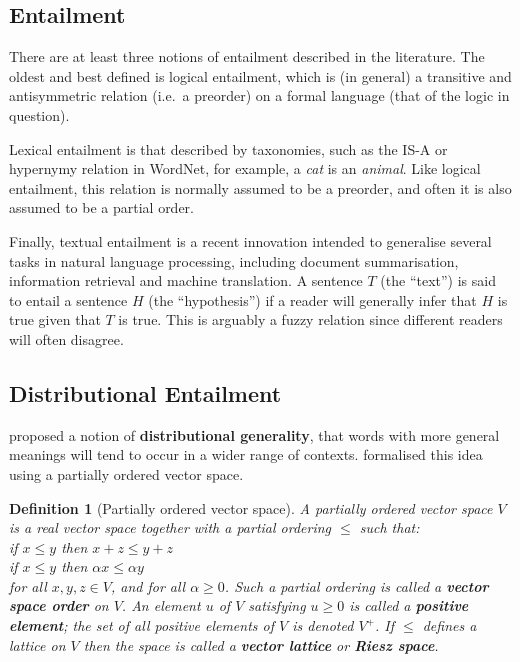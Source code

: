 \documentclass{article}
\newtheorem{definition}{Definition}
\begin{document}
\subsection{Entailment}

There are at least three notions of entailment described in the
literature. The oldest and best defined is logical entailment, which
is (in general) a transitive and antisymmetric relation (i.e.~a
preorder) on a formal language (that of the logic in question).

Lexical entailment is that described by taxonomies, such as the IS-A
or hypernymy relation in WordNet, for example, a \emph{cat} is an
\emph{animal}. Like logical entailment, this relation is normally
assumed to be a preorder, and often it is also assumed to be a partial
order.

Finally, textual entailment is a recent innovation intended to
generalise several tasks in natural language processing, including
document summarisation, information retrieval and machine
translation. A sentence $T$ (the ``text'') is said to entail a
sentence $H$ (the ``hypothesis'') if a reader will generally infer
that $H$ is true given that $T$ is true. This is arguably a fuzzy
relation since different readers will often disagree.

\subsection{Distributional Entailment}

 proposed a notion of \textbf{distributional
  generality}, that words with more general meanings will tend to
occur in a wider range of contexts.  formalised
this idea using a partially ordered vector space.

\begin{definition}[Partially ordered vector space]
  A partially ordered vector space $V$ is a real vector space together
  with a partial ordering $\le$ such that:
  \vspace{0.1cm}\\
  \indent if $x \le y$ then $x + z \le y + z$\\
  \indent if $x \le y$ then $\alpha x \le \alpha y$
  \vspace{0.1cm}\\
  for all $x,y,z \in V$, and for all $\alpha \ge 0$. Such a partial
  ordering is called a \textbf{vector space order} on $V$. An element
  $u$ of $V$ satisfying $u \ge 0$ is called a \textbf{positive
    element}; the set of all positive elements of $V$ is denoted
  $V^+$. If $\le$ defines a lattice on $V$ then the space is called a
  \textbf{vector lattice} or \textbf{Riesz space}.
\end{definition}
\end{document}
